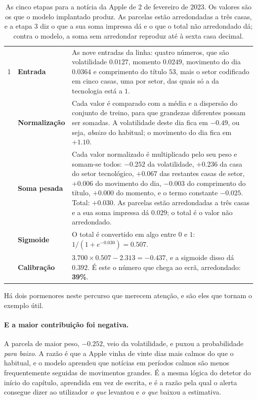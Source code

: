 \begin{table}[ht]
\caption[Uma linha, do início ao fim]{As cinco etapas para a notícia da Apple de 2 de fevereiro de
2023. Os valores são os que o modelo implantado produz. As parcelas estão arredondadas a três
casas, e a etapa 3 diz o que a sua soma impressa dá e o que o total não arredondado dá; contra
o modelo, a soma sem arredondar reproduz até à sexta casa decimal.}
\label{tab:met_conta}
\centering
\small
\begin{tabular}{L{0.06\textwidth} L{0.34\textwidth} L{0.44\textwidth}}
\toprule
 &  &  \\
 & \textbf{Entrada} & As nove entradas da linha: quatro números, que são volatilidade $0.0127$,
momento $0.0249$, movimento do dia $0.0364$ e comprimento do título $53$, mais o setor codificado
em cinco casas, uma por setor, das quais só a da tecnologia está a $1$. \\
 & \textbf{Normalização} & Cada valor é comparado com a média e a dispersão do conjunto de treino,
para que grandezas diferentes possam ser somadas. A volatilidade deste dia fica em $-0.49$, ou
seja, \emph{abaixo} do habitual; o movimento do dia fica em $+1.10$. \\
 & \textbf{Soma pesada} & Cada valor normalizado é multiplicado pelo seu peso e somam-se todos:
$-0.252$ da volatilidade, $+0.236$ da casa do setor tecnológico, $+0.067$ das restantes casas de
setor, $+0.006$ do movimento do dia, $-0.003$ do comprimento do título, $+0.000$ do momento, e o
termo constante $-0.025$. Total: $\mathbf{+0.030}$. As parcelas estão arredondadas a três casas e
a sua soma impressa dá $0.029$; o total é o valor não arredondado. \\
 & \textbf{Sigmoide} & O total é convertido em algo entre $0$ e $1$:
$1/(1+e^{-0.030}) = \mathbf{0.507}$. \\
 & \textbf{Calibração} & $3.700 \times 0.507 - 2.313 = -0.437$, e a sigmoide disso dá
$\mathbf{0.392}$. É este o número que chega ao ecrã, arredondado: \textbf{39\%}. \\
\bottomrule
\end{tabular}
\end{table}

Há dois pormenores neste percurso que merecem atenção, e são eles que tornam o exemplo útil.

\paragraph{E a maior contribuição foi negativa.}
A parcela de maior peso, $-0.252$, veio da volatilidade, e puxou a probabilidade \emph{para baixo}.
A razão é que a Apple vinha de vinte dias mais calmos do que o habitual, e o modelo aprendeu que
notícias em períodos calmos são menos frequentemente seguidas de movimentos grandes. É a mesma
lógica do detetor do início do capítulo, aprendida em vez de escrita, e é a razão pela qual o alerta
consegue dizer ao utilizador \emph{o que} levantou e \emph{o que} baixou a estimativa.

